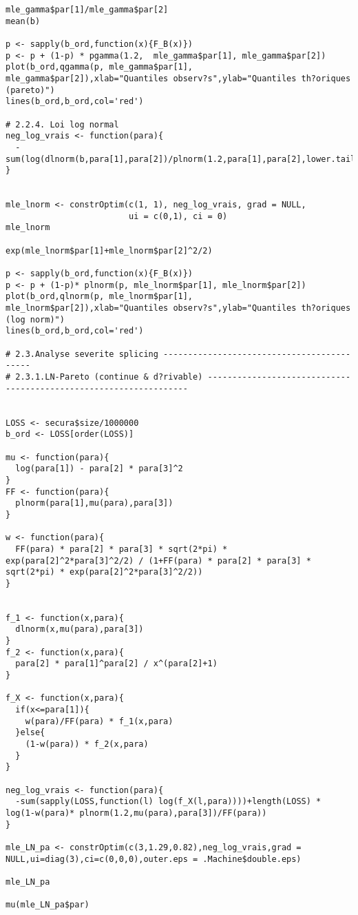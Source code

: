\begin{verbatim}
mle_gamma$par[1]/mle_gamma$par[2]
mean(b)

p <- sapply(b_ord,function(x){F_B(x)})
p <- p + (1-p) * pgamma(1.2,  mle_gamma$par[1], mle_gamma$par[2])
plot(b_ord,qgamma(p, mle_gamma$par[1], mle_gamma$par[2]),xlab="Quantiles observ?s",ylab="Quantiles th?oriques (pareto)")
lines(b_ord,b_ord,col='red')

# 2.2.4. Loi log normal
neg_log_vrais <- function(para){
  -sum(log(dlnorm(b,para[1],para[2])/plnorm(1.2,para[1],para[2],lower.tail=FALSE)))
}


mle_lnorm <- constrOptim(c(1, 1), neg_log_vrais, grad = NULL, 
                         ui = c(0,1), ci = 0)
mle_lnorm

exp(mle_lnorm$par[1]+mle_lnorm$par[2]^2/2)

p <- sapply(b_ord,function(x){F_B(x)})
p <- p + (1-p)* plnorm(p, mle_lnorm$par[1], mle_lnorm$par[2])
plot(b_ord,qlnorm(p, mle_lnorm$par[1], mle_lnorm$par[2]),xlab="Quantiles observ?s",ylab="Quantiles th?oriques (log norm)")
lines(b_ord,b_ord,col='red')

# 2.3.Analyse severite splicing -------------------------------------------
# 2.3.1.LN-Pareto (continue & d?rivable) ------------------------------------------------------------------


LOSS <- secura$size/1000000
b_ord <- LOSS[order(LOSS)]

mu <- function(para){
  log(para[1]) - para[2] * para[3]^2
}
FF <- function(para){
  plnorm(para[1],mu(para),para[3])
}

w <- function(para){
  FF(para) * para[2] * para[3] * sqrt(2*pi) * exp(para[2]^2*para[3]^2/2) / (1+FF(para) * para[2] * para[3] * sqrt(2*pi) * exp(para[2]^2*para[3]^2/2))
}


f_1 <- function(x,para){
  dlnorm(x,mu(para),para[3])
}
f_2 <- function(x,para){
  para[2] * para[1]^para[2] / x^(para[2]+1)
}

f_X <- function(x,para){
  if(x<=para[1]){
    w(para)/FF(para) * f_1(x,para)
  }else{
    (1-w(para)) * f_2(x,para)
  } 
}

neg_log_vrais <- function(para){
  -sum(sapply(LOSS,function(l) log(f_X(l,para))))+length(LOSS) * log(1-w(para)* plnorm(1.2,mu(para),para[3])/FF(para))
}

mle_LN_pa <- constrOptim(c(3,1.29,0.82),neg_log_vrais,grad = NULL,ui=diag(3),ci=c(0,0,0),outer.eps = .Machine$double.eps)

mle_LN_pa

mu(mle_LN_pa$par)


\end{verbatim}
